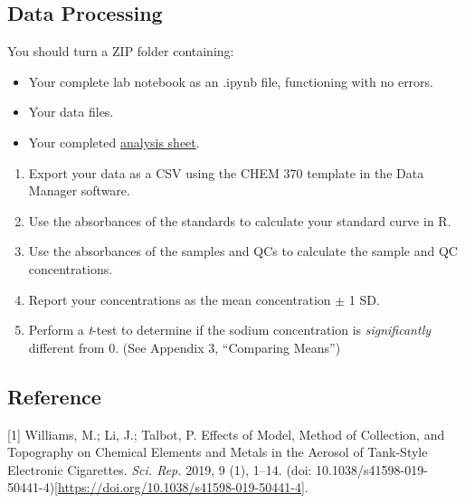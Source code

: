 \documentclass[]{tufte-book}
\providecommand{\tightlist}{%
  \setlength{\itemsep}{0pt}\setlength{\parskip}{0pt}}
\begin{document}
\hypertarget{data-processing-8}{%
\subsection{Data Processing}\label{data-processing-8}}

\begin{marginfigure}
You should turn a ZIP folder containing:

\begin{itemize}
\tightlist
\item
  Your complete lab notebook as an .ipynb file, functioning with no
  errors.\\
\item
  Your data files.\\
\item
  Your completed
  \href{https://github.com/alphonse/alphonse.github.io/raw/master/chem370/assignments/excel-templates/rotation_faas_data-analysis.xlsx}{analysis
  sheet}.
\end{itemize}
\end{marginfigure}

\begin{enumerate}
\def\labelenumi{\arabic{enumi}.}
\tightlist
\item
  Export your data as a CSV using the CHEM 370 template in the Data Manager software.
\item
  Use the absorbances of the standards to calculate your standard curve in R.
\item
  Use the absorbances of the samples and QCs to calculate the sample and QC concentrations.
\item
  Report your concentrations as the mean concentration \(\pm\) 1 SD.
\item
  Perform a \emph{t}-test to determine if the sodium concentration is \emph{significantly} different from 0. (See Appendix 3, ``Comparing Means'')
\end{enumerate}

\hypertarget{reference-2}{%
\subsection{Reference}\label{reference-2}}

{[}1{]} Williams, M.; Li, J.; Talbot, P. Effects of Model, Method of Collection, and Topography on Chemical Elements and Metals in the Aerosol of Tank-Style Electronic Cigarettes. \emph{Sci. Rep.} 2019, 9 (1), 1--14. (doi: 10.1038/s41598-019-50441-4){[}\url{https://doi.org/10.1038/s41598-019-50441-4}{]}.
\end{document}
